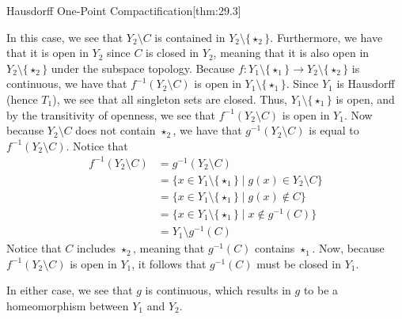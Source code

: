 \begin{thmBox}{Hausdorff One-Point Compactification}[thm:29.3]
\begin{proofBox}
        In this case, we see that \( Y_{ 2 } \setminus C \) is contained in 
        \( Y_{ 2 } \setminus \{ \star_{ 2 } \} \).
        Furthermore, we have that it is open in \( Y_{ 2 } \) since \( C \) is closed in \( Y_{ 2 } \), meaning that it is also open in 
        \( Y_{ 2 } \setminus \{ \star_{ 2 } \} \) under the subspace topology.
        Because \( f: Y_{ 1 } \setminus \{ \star_{ 1 } \} \rightarrow 
        Y_{ 2 } \setminus \{ \star_{ 2 } \} \) is continuous, we have that 
        \( f^{ -1 } ( Y_{ 2 } \setminus C ) \) is open in 
        \( Y_{ 1 } \setminus \{ \star_{ 1 } \} \).
        Since \( Y_{ 1 } \) is Hausdorff (hence \( T_{ 1 } \)), we see that 
        all singleton sets are closed.
        Thus, \( Y_{ 1 } \setminus \{ \star_{ 1 } \} \) is open, and by the 
        transitivity of openness, we see that 
        \( f^{ -1 } ( Y_{ 2 } \setminus C ) \) is open in \( Y_{ 1 } \).
        Now because \( Y_{ 2 } \setminus C \) does not contain 
        \( \star_{ 2 } \), we have that \( g^{ -1 } ( Y_{ 2 } \setminus C ) \)
        is equal to \( f^{ -1 } ( Y_{ 2 } \setminus C ) \).
        Notice that 
        \begin{equation*}
            \begin{aligned}
                f^{ -1 } ( Y_{ 2 } \setminus C )
                &=
                g^{ -1 } ( Y_{ 2 } \setminus C )
                \\
                &=
                \{ x \in Y_{ 1 } \setminus \{ \star_{ 1 } \} \mid g ( x ) \in 
                Y_{ 2 } \setminus C \}
                \\
                &=
                \{ x \in Y_{ 1 } \setminus \{ \star_{ 1 } \} \mid g ( x ) 
                \notin C \}
                \\
                &=
                \{ 
                    x \in Y_{ 1 } \setminus \{ \star_{ 1 } \} 
                    \mid x \notin g^{ -1 } ( C ) 
                \}
                \\
                &=
                Y_{ 1 } \setminus g^{ -1 } ( C )
            \end{aligned}
        \end{equation*}
        Notice that \( C \) includes \( \star_{ 2 } \), meaning that 
        \( g^{ -1 } ( C ) \) contains \( \star_{ 1 } \).
        Now, because \( f^{ -1 } ( Y_{ 2 } \setminus C ) \) is open in 
        \( Y_{ 1 } \), it follows that \( g^{ -1 } ( C ) \) must be closed in 
        \( Y_{ 1 } \).

        \baseSkip

        In either case, we see that \( g \) is continuous, which results in \( g \) to
        be a homeomorphism between \( Y_{ 1 } \) and \( Y_{ 2 } \).
    \end{proofBox}
\end{thmBox}

